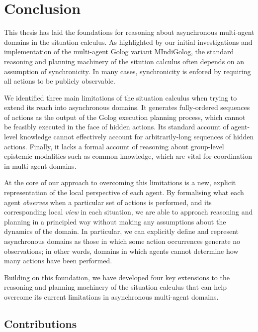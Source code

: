

\chapter{Conclusion}

\label{ch:conclusion}

This thesis has laid the foundations for reasoning about asynchronous
multi-agent domains in the situation calculus. As highlighted by our
initial investigations and implementation of the multi-agent Golog
variant MIndiGolog, the standard reasoning and planning machinery
of the sitution calculus often depends on an assumption of synchronicity.
In many cases, synchronicity is enfored by requiring all actions to
be publicly observable.

We identified three main limitations of the situation calculus when
trying to extend its reach into asynchronous domains. It generates
fully-ordered sequences of actions as the output of the Golog execution
planning process, which cannot be feasibly executed in the face of
hidden actions. Its standard account of agent-level knowledge cannot
effectively account for arbitrarily-long sequences of hidden actions.
Finally, it lacks a formal account of reasoning about group-level
epistemic modalities such as common knowledge, which are vital for
coordination in multi-agent domains.

At the core of our approach to overcoming this limitations is a new,
explicit representation of the local perspective of each agent. By
formalising what each agent \emph{observes} when a particular set
of actions is performed, and its corresponding local \emph{view }in
each situation, we are able to approach reasoning and planning in
a principled way without making any assumptions about the dynamics
of the domain. In particular, we can explicitly define and represent
asynchronous domains as those in which some action occurrences generate
no observations; in other words, domains in which agents cannot determine
how many actions have been performed. 

Building on this foundation, we have developed four key extensions
to the reasoning and planning machinery of the situation calculus
that can help overcome its current limitations in asynchronous multi-agent
domains. 


\section{Contributions}

